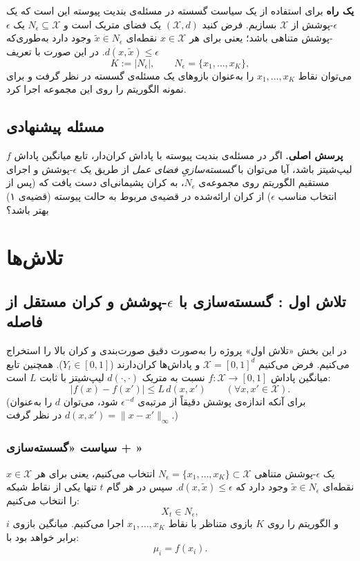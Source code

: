 \documentclass[a4paper,10pt,twocolumn]{article}
\begin{document}
\noindent
\textbf{یک راه} برای استفاده از یک سیاست گسسته در مسئله‌ی بندیت پیوسته این است که
یک \(\epsilon\)-پوشش از $\mathcal{X}$ بسازیم.
فرض کنید $(\mathcal{X},d)$ یک فضای متریک است و $N_\epsilon\subseteq \mathcal{X}$ یک $\epsilon$-پوشش متناهی باشد؛
یعنی برای هر $x\in\mathcal{X}$ نقطه‌ای $\tilde x\in N_\epsilon$ وجود دارد به‌طوری‌که
$d(x,\tilde x)\le \epsilon$.
در این صورت با تعریف
\[
K:=|N_\epsilon|,\qquad N_\epsilon=\{x_1,\dots,x_K\},
\]
می‌توان نقاط $x_1,\dots,x_K$ را به‌عنوان بازوهای یک مسئله‌ی گسسته در نظر گرفت و
برای نمونه الگوریتم  را روی این مجموعه اجرا کرد.


\subsection{مسئله پیشنهادی}

\noindent
\textbf{پرسش اصلی.}
اگر در مسئله‌ی بندیت پیوسته با پاداش کران‌دار، تابع میانگین پاداش $f$ لیپ‌شیتز باشد،
آیا می‌توان با \emph{گسسته‌سازیِ فضای عمل} از طریق یک $\epsilon$-پوشش و اجرای مستقیم
الگوریتم  روی مجموعه‌ی $N_\epsilon$،
به کران پشیمانی‌ای دست یافت که (پس از انتخاب مناسب $\epsilon$) از کران ارائه‌شده در
قضیه‌ی مربوط به حالت پیوسته (قضیه‌ی ۱) بهتر باشد؟


\section{تلاش‌ها}

\subsection{تلاش اول : گسسته‌سازی با \(\epsilon\)-پوشش و کران مستقل از فاصله}
\label{sec:attempt1}

در این بخش «تلاش اول» پروژه را به‌صورت دقیق صورت‌بندی و کران بالا را استخراج می‌کنیم.
فرض می‌کنیم $\mathcal{X}=[0,1]^d$ و پاداش‌ها کران‌دارند ($Y_t\in[0,1]$).
همچنین تابع میانگین پاداش $f:\mathcal{X}\to[0,1]$ نسبت به متریک $d(\cdot,\cdot)$ لیپ‌شیتز با ثابت $L$ است:
\[
|f(x)-f(x')|\le L\,d(x,x')\qquad(\forall x,x'\in\mathcal{X}).
\]
(برای آنکه اندازه‌ی پوشش دقیقاً از مرتبه‌ی $\epsilon^{-d}$ شود، می‌توان $d$ را به‌عنوان
$d(x,x')=\|x-x'\|_\infty$ در نظر گرفت.)

\subsubsection{سیاست «گسسته‌سازی + »}

یک $\epsilon$-پوشش متناهی $N_\epsilon=\{x_1,\dots,x_K\}\subset\mathcal{X}$ انتخاب می‌کنیم، یعنی برای هر
$x\in\mathcal{X}$ نقطه‌ای $\tilde x\in N_\epsilon$ وجود دارد که $d(x,\tilde x)\le\epsilon$.
سپس در هر گام $t$ تنها یکی از نقاط شبکه را انتخاب می‌کنیم:
\[
X_t \in N_\epsilon,
\]
و الگوریتم  را روی $K$ بازوی متناظر با نقاط $x_1,\dots,x_K$ اجرا می‌کنیم.
میانگین بازوی $i$ برابر خواهد بود با: \[\mu_i=f(x_i).\]
\end{document}
